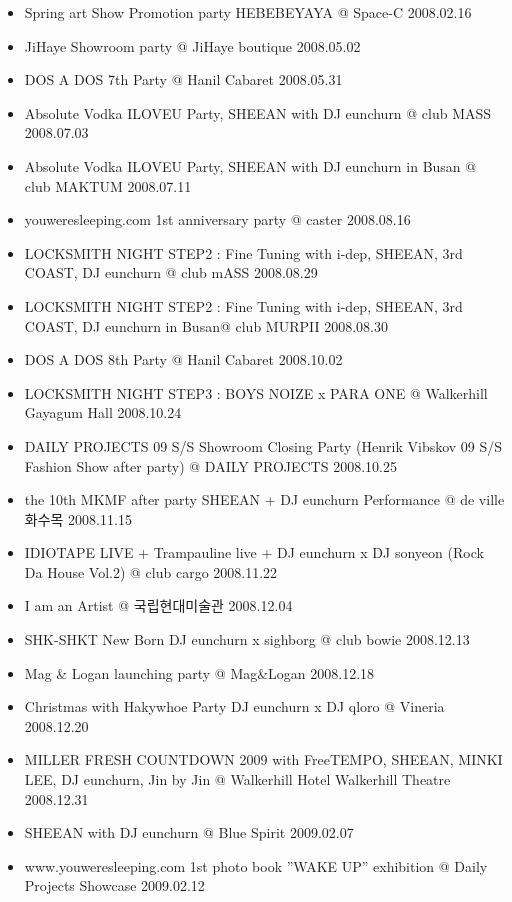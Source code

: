 \begin{itemize}
\item Spring art Show Promotion party HEBEBEYAYA @ Space-C \hfill 2008.02.16
\item JiHaye Showroom party @ JiHaye boutique \hfill 2008.05.02
\item DOS A DOS 7th Party @ Hanil Cabaret \hfill 2008.05.31
\item Absolute Vodka ILOVEU Party, SHEEAN with DJ eunchurn @ club MASS \hfill 2008.07.03
\item Absolute Vodka ILOVEU Party, SHEEAN with DJ eunchurn in Busan @ club MAKTUM \hfill 2008.07.11
\item youweresleeping.com 1st anniversary party @ caster \hfill 2008.08.16
\item LOCKSMITH NIGHT STEP2 : Fine Tuning with i-dep, SHEEAN, 3rd COAST, DJ eunchurn @ club mASS \hfill 2008.08.29
\item LOCKSMITH NIGHT STEP2 : Fine Tuning with i-dep, SHEEAN, 3rd COAST, DJ eunchurn in Busan@ club MURPII \hfill 2008.08.30
\item DOS A DOS 8th Party @ Hanil Cabaret \hfill 2008.10.02
\item LOCKSMITH NIGHT STEP3 : BOYS NOIZE x PARA ONE @ Walkerhill Gayagum Hall \hfill 2008.10.24
\item DAILY PROJECTS 09 S/S Showroom Closing Party (Henrik Vibskov 09 S/S Fashion Show after party) @ DAILY PROJECTS \hfill 2008.10.25
\item the 10th MKMF after party SHEEAN + DJ eunchurn Performance @ de ville 화수목 \hfill 2008.11.15
\item IDIOTAPE LIVE + Trampauline live + DJ eunchurn x DJ sonyeon (Rock Da House Vol.2) @ club cargo \hfill 2008.11.22
\item I am an Artist @ 국립현대미술관 \hfill 2008.12.04
\item SHK-SHKT New Born DJ eunchurn x sighborg @ club bowie \hfill 2008.12.13
\item Mag \& Logan launching party @ Mag\&Logan \hfill 2008.12.18
\item Christmas with Hakywhoe Party DJ eunchurn x DJ qloro @ Vineria \hfill 2008.12.20
\item MILLER FRESH COUNTDOWN 2009 with FreeTEMPO, SHEEAN, MINKI LEE, DJ eunchurn, Jin by Jin @ Walkerhill Hotel Walkerhill Theatre \hfill 2008.12.31
\item SHEEAN with DJ eunchurn @ Blue Spirit \hfill 2009.02.07
\item www.youweresleeping.com 1st photo book ”WAKE UP” exhibition @ Daily Projects Showcase \hfill 2009.02.12

\end{itemize}
